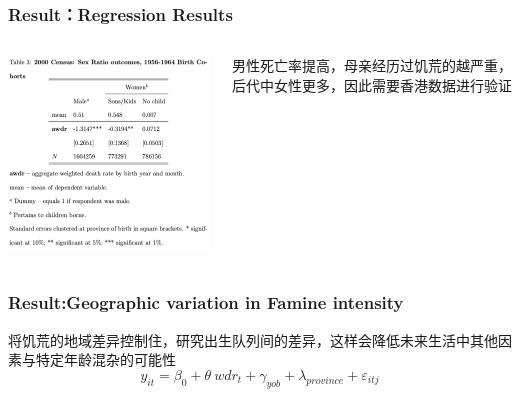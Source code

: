 \documentclass{beamer}
\begin{document}
\begin{frame}
\frametitle{Result：Regression Results}
	\begin{columns}
            \begin{minipage}[c][0.4\textheight][c]{\linewidth}
                \centering
                \includegraphics[width=1\linewidth]{table3}
            \end{minipage}
           
           	\begin{minipage}[c][0.4\textheight][c]{\linewidth}
            男性死亡率提高，母亲经历过饥荒的越严重，后代中女性更多，因此需要香港数据进行验证
            \end{minipage}
    \end{columns}
\end{frame}

\begin{frame}
	\frametitle{Result:Geographic variation in Famine intensity}
    将饥荒的地域差异控制住，研究出生队列间的差异，这样会降低未来生活中其他因素与特定年龄混杂的可能性
$$y_{it}=\beta_0+\theta~wdr_t+\gamma_{yob}+\lambda_{province}+\varepsilon_{itj}$$
\end{frame}
\end{document}
